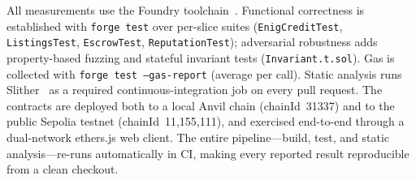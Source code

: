 All measurements use the Foundry toolchain~\cite{foundry}. Functional correctness is established with \texttt{forge test} over per-slice suites (\texttt{EnigCreditTest}, \texttt{ListingsTest}, \texttt{EscrowTest}, \texttt{ReputationTest}); adversarial robustness adds property-based fuzzing and stateful invariant tests (\texttt{Invariant.t.sol}). Gas is collected with \texttt{forge test --gas-report} (average per call). Static analysis runs Slither~\cite{feist2019slither} as a required continuous-integration job on every pull request. The contracts are deployed both to a local Anvil chain (chainId~31337) and to the public Sepolia testnet (chainId~11{,}155{,}111), and exercised end-to-end through a dual-network ethers.js web client. The entire pipeline---build, test, and static analysis---re-runs automatically in CI, making every reported result reproducible from a clean checkout.
